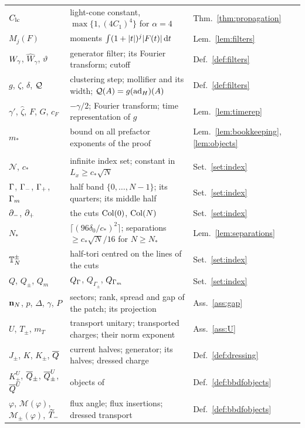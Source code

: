 \begin{longtable}{@{}>{\raggedright\arraybackslash}p{}>{\raggedright\arraybackslash}p{}>{\raggedright\arraybackslash}p{}@{}}
$C_{\rm lc}$ & light-cone constant, $\max\{1,(4C_1)^4\}$ for $\alpha=4$ & Thm.~\ref{thm:propagation}\\
$M_j(F)$ & moments $\int(1+\lvert t\rvert)^j\lvert F(t)\rvert\,\mathrm{d} t$ & Lem.~\ref{lem:filters}\\
$W_{\gamma}$, $\widehat W_\gamma$, $\vartheta$ & generator filter; its Fourier transform; cutoff & Def.~\ref{def:filters}\\
$g$, $\zeta$, $\delta$, $\mathcal{Q}$ & clustering step; mollifier and its width; $\mathcal{Q}(A)=g(\operatorname{ad}_H)(A)$ & Def.~\ref{def:filters}\\
$\gamma'$, $\hat\zeta$, $F$, $G$, $c_F$ & $-\gamma/2$; Fourier transform; time representation of $g$ & Lem.~\ref{lem:timerep}\\
$m_*$ & bound on all prefactor exponents of the proof & Lem.~\ref{lem:bookkeeping}, \ref{lem:objects}\\
\midrule
\multicolumn{3}{@{}l}{\emph{The index theorem (Sections~\ref{sec:index}--\ref{sec:translation})}}\\*
$\mathcal N$, $c_*$ & infinite index set; constant in $L_x\ge c_*\sqrt N$ & Set.~\ref{set:index}\\
$\Gamma$, $\Gamma_{-}$, $\Gamma_{+}$, $\Gamma_{m}$ & half band $\{0,\dots,N-1\}$; its quarters; its middle half & Set.~\ref{set:index}\\
$\partial_{-}$, $\partial_{+}$ & the cuts $\mathrm{Col}(0)$, $\mathrm{Col}(N)$ & Set.~\ref{set:index}\\
$N_*$ & $\lceil(96\delta_0/c_*)^2\rceil$; separations $\ge c_*\sqrt N/16$ for $N\ge N_*$ & Lem.~\ref{lem:separations}\\
$\mathbb{T}_N^\pm$ & half-tori centred on the lines of the cuts & Set.~\ref{set:index}\\
$Q$, $Q_\pm$, $Q_m$ & $Q_\Gamma$, $Q_{\Gamma_\pm}$, $Q_{\Gamma_{m}}$ & Set.~\ref{set:index}\\
$\mathbf{n}_N$, $p$, $\Delta$, $\gamma$, $P$ & sectors; rank, spread and gap of the patch; its projection & Ass.~\ref{ass:gap}\\
$U$, $T_\pm$, $m_T$ & transport unitary; transported charges; their norm exponent & Ass.~\ref{ass:U}\\
$J_\pm$, $K$, $K_\pm$, $\overline{Q}$ & current halves; generator; its halves; dressed charge & Def.~\ref{def:dressing}\\
$K^U_\pm$, $\overline{Q}_\pm$, $\overline{Q}^U_\pm$, $\overline{Q}^U$ & objects of \cite[Section~4.2]{BBDF21} & Def.~\ref{def:bbdfobjects}\\
$\varphi$, $\mathcal M(\varphi)$, $\mathcal M_\pm(\varphi)$, $\widetilde{T}_{-}$ & flux angle; flux insertions; dressed transport & Def.~\ref{def:bbdfobjects}\\

\end{longtable}
